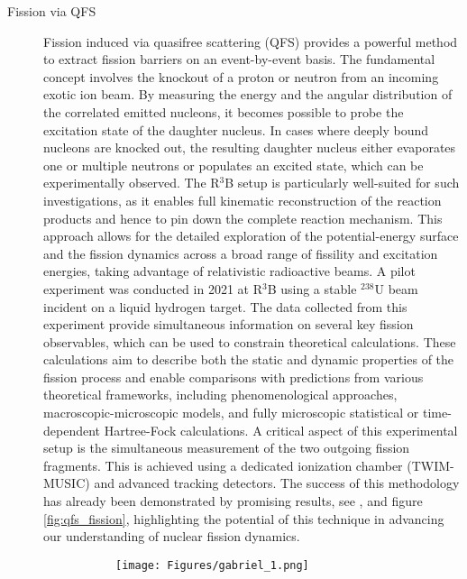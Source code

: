 \begin{description}
\item[Fission via QFS]Fission induced via quasifree scattering (QFS) provides a powerful method to extract fission barriers on an event-by-event basis. The fundamental concept involves the knockout of a proton or neutron from an incoming exotic ion beam. By measuring the energy  and the angular distribution of the correlated emitted nucleons, it becomes possible to probe the excitation state of the daughter nucleus. In cases where deeply bound nucleons are knocked out, the resulting daughter nucleus either evaporates one or multiple neutrons or populates an excited state, which can be experimentally observed. The R$^3$B setup is particularly well-suited for such investigations, as it enables full kinematic reconstruction of the reaction products and hence to pin down the complete reaction mechanism. This approach allows for the detailed exploration of the potential-energy surface and the fission dynamics across a broad range of fissility and excitation energies, taking advantage of relativistic radioactive beams.\newline
A pilot experiment was conducted in 2021 at R$^3$B using a stable $^{238}$U beam incident on a liquid hydrogen target. The data collected from this experiment provide simultaneous information on several key fission observables, which can be used to constrain theoretical calculations. These calculations aim to describe both the static and dynamic properties of the fission process and enable comparisons with predictions from various theoretical frameworks, including phenomenological approaches, macroscopic-microscopic models, and fully microscopic statistical or time-dependent Hartree-Fock calculations.\newline
A critical aspect of this experimental setup is the simultaneous measurement of the two outgoing fission fragments. This is achieved using a dedicated ionization chamber (TWIM-MUSIC) and advanced tracking detectors. The success of this methodology has already been demonstrated by promising results, see \cite{garcia2023study},\cite{grana2023fission} and figure \ref{fig:qfs_fission}, highlighting the potential of this technique in advancing our understanding of nuclear fission dynamics.
\begin{figure}[htpb]
    \centering
    \begin{subfigure}[b]{0.3\textwidth}
    \texttt{[image: Figures/gabriel\_1.png]} 
    \end{subfigure}
    \begin{subfigure}[b]{0.3\textwidth}

\end{subfigure}
\end{figure}
\end{description}
